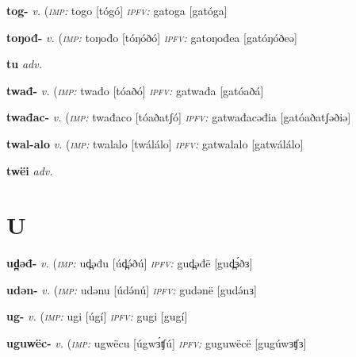 \newentry
\headword\textbf{tog-}  
\ipa{[tóg-]}
\synpos\textit{v.} 
\imperative(\textit {\textsc{imp:}} togo [tógó]	
\imperfective\textit{\textsc{ipfv:}} gatoga [gatóga]

\newentry
\headword\textbf{toŋođ-}  
\ipa{[tóŋóð-]}
\synpos\textit{v.} 
\imperative(\textit {\textsc{imp:}} toŋođo [tóŋóðó]	
\imperfective\textit{\textsc{ipfv:}} gatoŋođea [gatóŋóðeə]

\newentry
\headword\textbf{tu}  
\ipa{[tu]}
\synpos\textit{adv.} 

\newentry
\headword\textbf{twađ-}  
\ipa{[tóað-]}
\synpos\textit{v.} 
\imperative(\textit {\textsc{imp:}} twađo [tóaðó]	
\imperfective\textit{\textsc{ipfv:}} gatwađa [gatóaðá]

\newentry
\headword\textbf{twađac-}  
\ipa{[tóaðátʃ-]}
\synpos\textit{v.} 
\imperative(\textit {\textsc{imp:}} twađaco [tóaðatʃó]	
\imperfective\textit{\textsc{ipfv:}} gatwađacəđia [gatóaðatʃəðiə]

\newentry
\headword\textbf{twal-alo}  
\synpos\textit{v.} 
\imperative(\textit {\textsc{imp:}} twalalo [twálálo]	
\imperfective\textit{\textsc{ipfv:}} gatwalalo [gatwálálo]

\newentry
\headword\textbf{twëi}  
\ipa{[twɜi]}
\synpos\textit{adv.} 

\section*{U}\label{U}


\newentry
\headword\textbf{ud̪əđ-}  
\ipa{[ud̪ə́ð-]}
\synpos\textit{v.} 
\imperative(\textit {\textsc{imp:}} ud̪əđu [úd̪ə́ðú]
\imperfective\textit{\textsc{ipfv:}} gud̪əđë [gud̪ɜ́ðɜ]

\newentry
\headword\textbf{udən-}  
\ipa{[udə́n-]}
\synpos\textit{v.} 
\imperative(\textit {\textsc{imp:}} udənu [údə́nú]
\imperfective\textit{\textsc{ipfv:}} gudənë [gudə́nɜ]

\newentry
\headword\textbf{ug-}  
\ipa{[ug-]}
\synpos\textit{v.} 
\imperative(\textit {\textsc{imp:}} ugi [úgí]  
\imperfective\textit{\textsc{ipfv:}} gugi [gugí]

\newentry
\headword\textbf{uguwëc-}  
\synpos\textit{v.} 
\imperative(\textit {\textsc{imp:}} ugwëcu [úgwɜ́ʧú] %
\imperfective\textit{\textsc{ipfv:}} guguwëcë [gugúwɜʧɜ]

